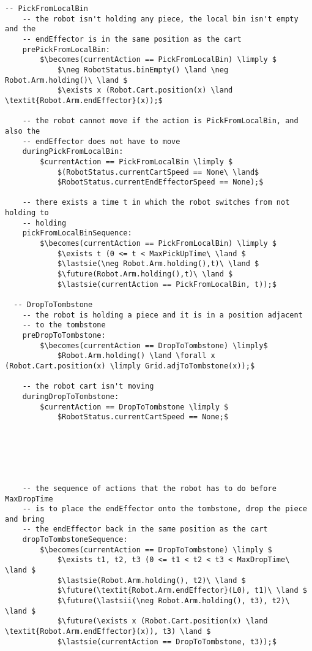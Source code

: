 \begin{lstlisting}[fontadjust, mathescape, frame=single]
  -- PickFromLocalBin
    -- the robot isn't holding any piece, the local bin isn't empty and the 
    -- endEffector is in the same position as the cart
    prePickFromLocalBin:
        $\becomes(currentAction == PickFromLocalBin) \limply $
            $\neg RobotStatus.binEmpty() \land \neg Robot.Arm.holding()\ \land $
            $\exists x (Robot.Cart.position(x) \land \textit{Robot.Arm.endEffector}(x));$
    
    -- the robot cannot move if the action is PickFromLocalBin, and also the 
    -- endEffector does not have to move
    duringPickFromLocalBin:
        $currentAction == PickFromLocalBin \limply $
            $(RobotStatus.currentCartSpeed == None\ \land$
            $RobotStatus.currentEndEffectorSpeed == None);$
  
    -- there exists a time t in which the robot switches from not holding to 
    -- holding
    pickFromLocalBinSequence:
        $\becomes(currentAction == PickFromLocalBin) \limply $
            $\exists t (0 <= t < MaxPickUpTime\ \land $
            $\lastsie(\neg Robot.Arm.holding(),t)\ \land $
            $\future(Robot.Arm.holding(),t)\ \land $
            $\lastsie(currentAction == PickFromLocalBin, t));$

  -- DropToTombstone
    -- the robot is holding a piece and it is in a position adjacent 
    -- to the tombstone
    preDropToTombstone:
        $\becomes(currentAction == DropToTombstone) \limply$
            $Robot.Arm.holding() \land \forall x (Robot.Cart.position(x) \limply Grid.adjToTombstone(x));$

    -- the robot cart isn't moving
    duringDropToTombstone:
        $currentAction == DropToTombstone \limply $
            $RobotStatus.currentCartSpeed == None;$






    -- the sequence of actions that the robot has to do before MaxDropTime 
    -- is to place the endEffector onto the tombstone, drop the piece and bring 
    -- the endEffector back in the same position as the cart
    dropToTombstoneSequence:
        $\becomes(currentAction == DropToTombstone) \limply $
            $\exists t1, t2, t3 (0 <= t1 < t2 < t3 < MaxDropTime\ \land $
            $\lastsie(Robot.Arm.holding(), t2)\ \land $
            $\future(\textit{Robot.Arm.endEffector}(L0), t1)\ \land $
            $\future(\lastsii(\neg Robot.Arm.holding(), t3), t2)\ \land $
            $\future(\exists x (Robot.Cart.position(x) \land \textit{Robot.Arm.endEffector}(x)), t3) \land $
            $\lastsie(currentAction == DropToTombstone, t3));$


\end{lstlisting}
